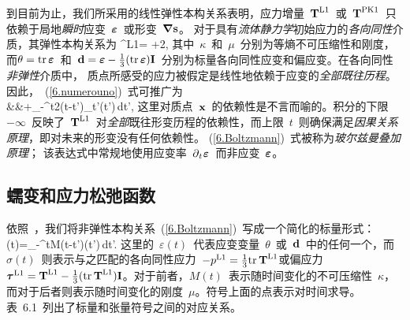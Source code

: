 到目前为止，我们所采用的线性弹性本构关系表明，应力增量~$\mbox{${\bf T}$}^{\rm L1}$~或~$\mbox{${\bf T}$}^{\rm PK1}$~只依赖于局地{\em 瞬时\/}应变~$\mbox{\boldmath $\bf \varepsilon$}$~或形变~$\mbox{\boldmath $\nabla$}\mbox{${\bf s}$}$。
%
%
对于具有{\em 流体静力学\/}初始应力的{\em 各向同性\/}介质，其弹性本构关系为
%
%
\eq
\label{6.numerouno}
\bT^{\rm L1}=\kappa\theta\bI
+2\mu\bd,
\en
其中~$\kappa$~和~$\mu$~分别为等熵不可压缩性和刚度，而$\theta={\rm tr}{\,}\mbox{\boldmath $\bf \varepsilon$}$~和~$\mbox{${\bf d}$}=\mbox{\boldmath $\bf \varepsilon$}-\mbox{$\frac{1}{3}$}({\rm tr}{\,}\mbox{\boldmath $\bf \varepsilon$})\mbox{${\bf I}$}$~分别为标量各向同性应变和偏应变。在各向同性{\em 非弹性\/}介质中，
%
质点所感受的应力被假定是线性地依赖于应变的{\em 全部既往历程\/}。
%
因此，~(\ref{6.numerouno})~式可推广为
%
\eqa
\label{6.Boltzmann}
 \nonumber \\
&&\mbox{}\qquad\qquad\qquad+\int_{-\infty}^t2\mu(t-t')\p_{t'}\bd(t')\,dt',
\ena
这里对质点~$\mbox{${\bf x}$}$~的依赖性是不言而喻的。积分的下限~$-\infty$~反映了~$\mbox{${\bf T}$}^{\rm L1}$~对{\em 全部\/}既往形变历程的依赖性，而上限~$t$~则确保满足{\em 因果关系原理\/}，即对未来的形变没有任何依赖性。
%
(\ref{6.Boltzmann})~式被称为{\em 玻尔兹曼叠加原理\/}；
%
该表达式中常规地使用应变率~$\mbox{$\partial$}_t\hspace{0.2 mm}\mbox{\boldmath $\bf \varepsilon$}$~而非应变~$\mbox{\boldmath $\bf \varepsilon$}$。

\subsection{蠕变和应力松弛函数}
%
%

依照~\textcite{nowick&berry72}，我们将非弹性本构关系~(\ref{6.Boltzmann})~写成一个简化的标量形式：
\eq
\label{6.Boltzmann4}
\sigma(t)=\int_{-\infty}^tM(t-t')\dot{\varepsilon}(t')\,dt'.
\en
这里的~$\varepsilon(t)$~代表应变变量~$\theta$~或~$\mbox{${\bf d}$}$~中的任何一个，而~$\sigma(t)$~则表示与之匹配的各向同性应力~$-p^{\rm L1}=\mbox{$\frac{1}{3}$}{\rm tr}_{\,}\mbox{${\bf T}$}^{\rm L1}$或偏应力~$\mbox{\boldmath $\bf \tau$}^{\rm L1}=\mbox{${\bf T}$}^{\rm L1}-\mbox{$\frac{1}{3}$}({\rm tr}_{\,}\mbox{${\bf T}$}^{\rm L1})\mbox{${\bf I}$}$。对于前者，$M(t)$~表示随时间变化的不可压缩性~$\kappa$，而对于后者则表示随时间变化的刚度~$\mu$。符号上面的点表示对时间求导。表~6.1~列出了标量和张量符号之间的对应关系。

